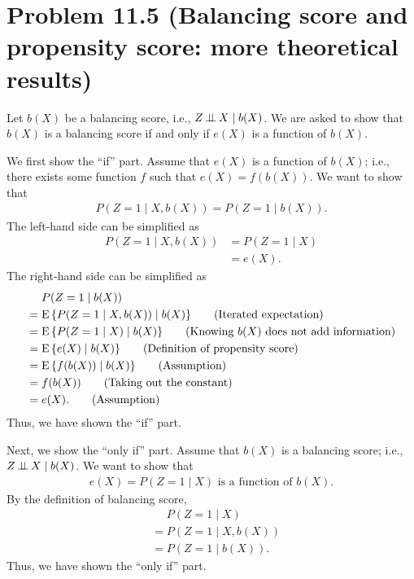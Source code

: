 \documentclass[10pt]{article}
\begin{document}
\section*{Problem 11.5 (Balancing score and propensity score: more theoretical results)}

Let $b(X)$ be a balancing score,
i.e., $Z \operatorname{\perp\!\!\!\perp} X \mid b(X)$.
We are asked to show that
$b(X)$ is a balancing score
if and only if
$e(X)$ is a function of $b(X)$.

We first show the ``if'' part.
Assume that $e(X)$ is a function of $b(X)$;
i.e., there exists some function $f$ such that
$e(X) = f(b(X))$.
We want to show that
\begin{align*}
  P(Z = 1 \mid X, b(X)) = P(Z = 1 \mid b(X)).
\end{align*}
The left-hand side can be simplified as
\begin{align*}
  P(Z = 1 \mid X, b(X))
  &= P(Z = 1 \mid X) \tag{Knowing $b(X)$ does not add information} \\
  &= e(X). \tag{Definition of propensity score}
\end{align*}
The right-hand side can be simplified as
\begin{align*}
  &\mathrel{\phantom{=}} P(Z = 1 \mid b(X)) \\
  &= \operatorname{E}{\left\lbrace P(Z = 1 \mid X, b(X)) \mid b(X) \right\rbrace} \tag{Iterated expectation} \\
  &= \operatorname{E}{\left\lbrace P(Z = 1 \mid X) \mid b(X) \right\rbrace} \tag{Knowing $b(X)$ does not add information} \\
  &= \operatorname{E}{\left\lbrace e(X) \mid b(X) \right\rbrace} \tag{Definition of propensity score} \\
  &= \operatorname{E}{\left\lbrace f(b(X)) \mid b(X) \right\rbrace} \tag{Assumption} \\
  &= f(b(X)) \tag{Taking out the constant} \\
  &= e(X). \tag{Assumption}
\end{align*}
Thus, we have shown the ``if'' part.

Next, we show the ``only if'' part.
Assume that $b(X)$ is a balancing score;
i.e., $Z \operatorname{\perp\!\!\!\perp} X \mid b(X)$.
We want to show that
\begin{align*}
  e(X) = P(Z = 1 \mid X)
  \text{ is a function of } b(X).
\end{align*}
By the definition of balancing score,
\begin{align*}
  &\mathrel{\phantom{=}} P(Z = 1 \mid X) \\
  &= P(Z = 1 \mid X, b(X)) \tag{Knowing $b(X)$ does not add information} \\
  &= P(Z = 1 \mid b(X)). \tag{Definition of balancing score}
\end{align*}
Thus, we have shown the ``only if'' part.
\end{document}
